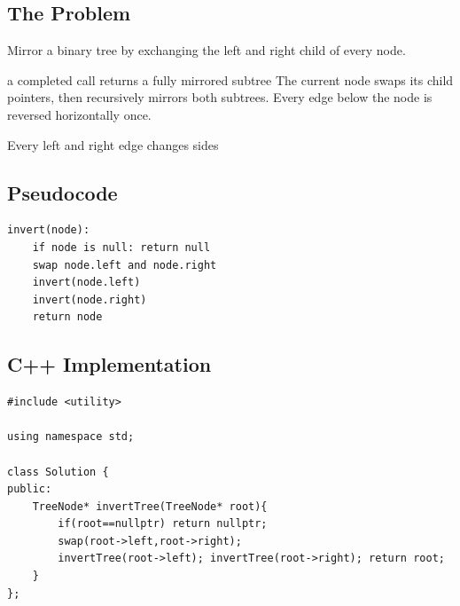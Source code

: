 \subsection{The Problem}
Mirror a binary tree by exchanging the left and right child of every node.

\begin{invariantbox}{a completed call returns a fully mirrored subtree}
The current node swaps its child pointers, then recursively mirrors both
subtrees. Every edge below the node is reversed horizontally once.
\end{invariantbox}

\begin{visualbox}{Every left and right edge changes sides}
\centering
{}
\end{visualbox}

\subsection{Pseudocode}
\begin{lstlisting}[style=pseudocode]
invert(node):
    if node is null: return null
    swap node.left and node.right
    invert(node.left)
    invert(node.right)
    return node
\end{lstlisting}

\subsection{C++ Implementation}
\begin{lstlisting}[style=compactcode,caption={Complete C++ solution: Invert Binary Tree}]
#include <utility>

using namespace std;

class Solution {
public:
    TreeNode* invertTree(TreeNode* root){
        if(root==nullptr) return nullptr;
        swap(root->left,root->right);
        invertTree(root->left); invertTree(root->right); return root;
    }
};
\end{lstlisting}

